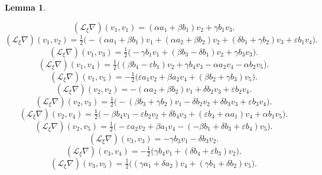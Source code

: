 \documentclass[10pt]{article}
\newtheorem{Lemma}{Lemma}
\begin{document}
\begin{Lemma}
\begin{enumerate}
\begin{equation} 
(\mathscr{L}_\xi\nabla) (v_1,v_1)=(\alpha a_1+\beta b_1)v_2+\gamma b_1v_3.\label{(v_1,v_1)}\end{equation}
\begin{equation}(\mathscr{L}_\xi\nabla) (v_1,v_2)=\tfrac{1}{2}\Big(-(\alpha a_1+\beta b_1)v_1+(\alpha a_2+\beta b_2)v_2+(\delta b_1+\gamma b_2)v_3+\varepsilon b_1v_4\Big).\end{equation} 
\begin{equation}(\mathscr{L}_\xi\nabla) (v_1,v_3)=\tfrac{1}{2}\Big(-\gamma b_1 v_1+(\beta b_3-\delta b_1)v_2+\gamma b_3v_3\Big).\end{equation}
\begin{equation}(\mathscr{L}_\xi\nabla) (v_1,v_4)=\tfrac{1}{2}\Big((\beta b_4-\varepsilon b_1)v_2+\gamma b_4 v_3-\alpha a_2v_4 -\alpha b_2v_5\Big).\end{equation} 
\begin{equation}(\mathscr{L}_\xi\nabla) (v_1,v_5)=-\tfrac{1}{2}\Big(\varepsilon a_1v_2+\beta a_2v_4+(\beta b_2+\gamma b_3)v_5\Big).\end{equation} 
\begin{equation}(\mathscr{L}_\xi\nabla) (v_2,v_2)=-(\alpha a_2+\beta b_2)v_1+\delta b_2v_3+\varepsilon b_2 v_4.\label{(v_2,v_2)}\end{equation} 
\begin{equation}(\mathscr{L}_\xi\nabla) (v_2,v_3)=\tfrac{1}{2}\Big(-(\beta b_3+\gamma b_2)v_1-\delta b_2v_2+\delta b_3v_3+\varepsilon b_3 v_4\Big).\end{equation}
\begin{equation}(\mathscr{L}_\xi\nabla) (v_2,v_4)=\tfrac{1}{2}\Big(-\beta b_4v_1-\varepsilon b_2 v_2+\delta b_4v_3+(\varepsilon b_4 +\alpha a_1 )v_4+\alpha b_1v_5\Big).\end{equation}
\begin{equation}(\mathscr{L}_\xi\nabla) (v_2,v_5)=\tfrac{1}{2}\Big(-\varepsilon a_2v_2+\beta a_1 v_4 -(-\beta b_1 +\delta b_3 +\varepsilon b_4)v_5\Big).\end{equation}
\begin{equation}(\mathscr{L}_\xi\nabla) (v_3,v_3)=-\gamma b_3v_1-\delta b_3v_2.\label{(v_3,v_3)}\end{equation}
\begin{equation}(\mathscr{L}_\xi\nabla) (v_3,v_4)=-\tfrac{1}{2}\Big(\gamma b_4 v_1+(\delta b_4+\varepsilon b_3) v_2\Big).\end{equation} 
\begin{equation}(\mathscr{L}_\xi\nabla) (v_3,v_5)=\tfrac{1}{2}\Big((\gamma a_1 +\delta a_2)v_4+(\gamma b_1+\delta b_2)v_5\Big).\end{equation}

\end{enumerate}
\end{Lemma}
\end{document}
